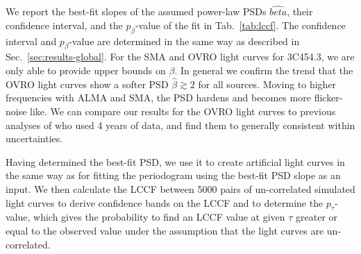 \documentclass[twocolumn,linenumbers]{aastex62}
\begin{document}
We report the best-fit slopes of the assumed power-law PSDs $\hat{beta}$, their confidence interval, and the $p_\beta$-value of the fit in Tab.~\ref{tab:lccf}.
The confidence interval and $p_\beta$-value are determined in the same way as described in Sec.~\ref{sec:results-global}.
For the SMA and OVRO light curves for 3C454.3, we are only able to provide upper bounds on $\beta$.
In general we confirm the trend that the OVRO light curves show a softer PSD $\hat{\beta} \gtrsim 2$ for all sources. 
Moving to higher frequencies with ALMA and SMA, the PSD hardens and becomes more flicker-noise like. 
We can compare our results for the OVRO light curves to previous analyses of \citet{2014MNRAS.445..428M} who used 4 years of data, and find them to generally consistent within uncertainties. 

Having determined the best-fit PSD, we use it to create artificial light curves in the same way as for fitting the periodogram using the best-fit PSD slope as an input.
We then calculate the LCCF between 5000 pairs of un-correlated simulated light curves to derive confidence bands on the LCCF and to determine the $p_\tau$-value, which gives the probability to find an LCCF value at given $\tau$ greater or equal to the observed value under the assumption that the light curves are un-correlated. 
\end{document}
